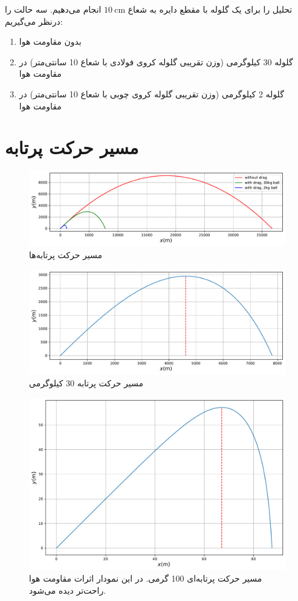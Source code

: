 \documentclass[a4paper,12pt]{article}
\begin{document}
	تحلیل را برای یک گلوله با مقطع دایره به شعاع $\SI{10}{\centi\meter}$ انجام می‌دهیم. سه حالت را درنظر می‌گیریم:
	\begin{enumerate}
		\item بدون مقاومت هوا
		\item گلوله 30 کیلوگرمی (وزن تقریبی گلوله کروی فولادی با شعاع 10 سانتی‌متر) در مقاومت هوا
		\item گلوله 2 کیلوگرمی (وزن تقریبی گلوله کروی چوبی با شعاع 10 سانتی‌متر) در مقاومت هوا
	\end{enumerate}
	
	\section{مسیر حرکت پرتابه}
	\begin{figure}[h]
		\centering
		\includegraphics[width=\linewidth]{../figures/xy}
		\caption{مسیر حرکت پرتابه‌ها}
	\end{figure}
	\begin{figure}[h]
		\centering
		\includegraphics[width=\linewidth]{../figures/heavy}
		\caption{مسیر حرکت پرتابه 30 کیلوگرمی}
	\end{figure}
	\begin{figure}[h]
		\centering
		\includegraphics[width=\linewidth]{../figures/light}
		\caption{مسیر حرکت پرتابه‌ای 100 گرمی. در این نمودار اثرات مقاومت هوا راحت‌تر دیده می‌شود.}
	\end{figure}
\end{document}
